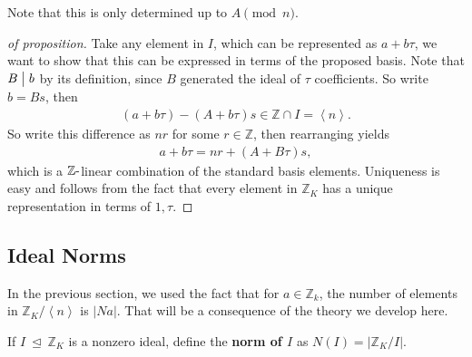 \begin{remark}

Note that this is only determined up to \(A \pmod n\).

\end{remark}

\begin{proof}[of proposition]

Take any element in \(I\), which can be represented as \(a + b \tau\),
we want to show that this can be expressed in terms of the proposed
basis. Note that \(B\bigm|b\) by its definition, since \(B\) generated
the ideal of \(\tau\) coefficients. So write \(b = Bs\), then
\begin{align*}
( a + b \tau) - (A + b \tau)s \in {\mathbb{Z}}\cap I = \left\langle{ n }\right\rangle 
.\end{align*}
So write this difference as \(nr\) for some \(r\in {\mathbb{Z}}\), then
rearranging yields
\begin{align*}
a + b \tau = nr + (A + B \tau)s
,\end{align*}
which is a \({\mathbb{Z}}{\hbox{-}}\)linear combination of the standard
basis elements. Uniqueness is easy and follows from the fact that every
element in \({\mathbb{Z}}_K\) has a unique representation in terms of
\(1, \tau\).

\end{proof}

\hypertarget{ideal-norms}{%
\subsection{Ideal Norms}\label{ideal-norms}}

\begin{remark}

In the previous section, we used the fact that for
\(a\in {\mathbb{Z}}_k\), the number of elements in
\({\mathbb{Z}}_K / \left\langle{ n }\right\rangle\) is
\({\left\lvert { N a } \right\rvert}\). That will be a consequence of
the theory we develop here.

\end{remark}

\begin{definition}

If \(I{~\trianglelefteq~}{\mathbb{Z}}_K\) is a nonzero ideal, define the
\textbf{norm of \(I\)} as
\(N(I) = {\left\lvert {{\mathbb{Z}}_K / I} \right\rvert}\).

\end{definition}

